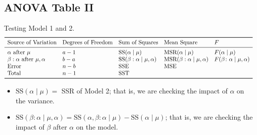 \subsection*{ANOVA Table II}
Testing Model 1 and 2.
\[ \begin{array}{lllll}
        \toprule
        \text{Source of Variation}           & \text{Degrees of Freedom} & \text{Sum of Squares}                  & \text{Mean Square}                      & F                                    \\
        \midrule
        \alpha\text{ after }\mu              & a-1                       & \text{SS}(\alpha\mid \mu)              & \text{MSR}(\alpha\mid \mu)              & F(\alpha\mid \mu)                    \\
        \beta:\alpha\text{ after }\mu,\alpha & b-a                       & \text{SS}(\beta:\alpha\mid \mu,\alpha) & \text{MSR}(\beta:\alpha\mid \mu,\alpha) & F(\beta\colon \alpha\mid \mu,\alpha) \\
        \text{Error}                         & n-b                       & \SSE                                   & \MSE                                                                           \\
        \text{Total}                         & n-1                       & \SST                                                                                                                    \\
        \bottomrule
    \end{array} \]
\begin{itemize}
    \item $ \text{SS}(\alpha\mid \mu)= $ SSR of Model 2; that is, we are checking the impact of
          $ \alpha $ on the variance.
    \item $ \text{SS}(\beta:\alpha\mid \mu,\alpha)=\text{SS}(\alpha,\beta:\alpha\mid \mu)-\text{SS}(\alpha\mid \mu) $; that is,
          we are checking the impact of $ \beta $ after $ \alpha $ on the model.
\end{itemize}
